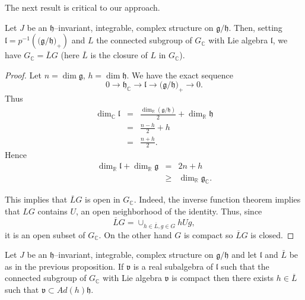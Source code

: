 \documentclass{amse-new}
\numberwithin{equation}{section} %
\begin{document}
The next result is critical to our approach.
\begin{proposition}
\label{prop:11} Let $J$ be an $\mathfrak{h}$--invariant, integrable, complex
structure on $\mathfrak{g}/\mathfrak{h}$. Then, setting $\mathfrak{l}%
=p^{-1}\left(  (\mathfrak{g}/\mathfrak{h)}_{+}\right)  $ and $L$ the connected
subgroup of $G_{\mathbb{C}}$ with Lie algebra $\mathfrak{l}$, we have $G_{\mathbb{C}}=\bar
{L}G$ (here $\bar{L}$ is the closure of $L$ in $G_{\mathbb{C}}$).
\end{proposition}

\begin{proof}
Let $n=\dim\mathfrak{g}$, $h=\dim\mathfrak{h}$. We have the exact sequence
\[
0\rightarrow\mathfrak{h}_{\mathbb{C}}\rightarrow\mathfrak{l}\rightarrow
(\mathfrak{g}/\mathfrak{h)}_{+}\rightarrow0.
\]
Thus
\begin{eqnarray*}
\dim_{\mathbb{C}}\mathfrak{l}&=&\frac{\dim_{\mathbb{R}}\left(  \mathfrak{g}%
/\mathfrak{h}\right)  }{2}+\dim_{\mathbb{R}}\mathfrak{h}\\
&=&\frac{n-h}{2}
+h\\
&=&\frac{n+h}{2}.
\end{eqnarray*}
Hence
\begin{eqnarray*}
\dim_{\mathbb{R}}\mathfrak{l}+\dim_{\mathbb{R}}\mathfrak{g}&=&2n+h\\&\geq&
\dim_{\mathbb{R}}\mathfrak{g}_{\mathbb{C}}.
\end{eqnarray*}


This implies that $\overline{L}G$ is open in $G_{\mathbb{C}}$. Indeed, the
inverse function theorem implies that $LG$ contains $U$, an open neighborhood
of the identity. Thus, since
\[
\overline{L}G=\cup_{h\in\overline{L},g\in G}hUg,
\]
it is an open subset of $G_{\mathbb{C}}$. On the other hand $G$ is compact
so $\overline{L}G$ is closed.
\end{proof}

\begin{proposition}
\label{prop:12} Let $J$ be an $\mathfrak{h}$--invariant, integrable, complex
structure on $\mathfrak{g}/\mathfrak{h}$ and let $\mathfrak{l}$ and $\bar{L}$
be as in the previous proposition. If $\mathfrak{v}$ is a real subalgebra of
$\mathfrak{l} $ such that the connected subgroup of $G_{\mathbb{C}}$ with Lie
algebra $\mathfrak{v}$ is compact then there exists $h\in\overline{L}$ such
that $\mathfrak{v}\subset Ad(h)\mathfrak{h}$.
\end{proposition}
\end{document}
